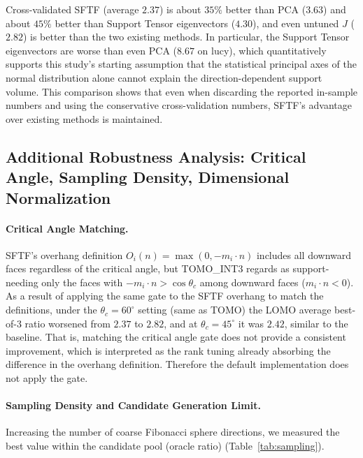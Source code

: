 \documentclass[11pt,a4paper]{article}
\begin{document}
Cross-validated SFTF (average $2.37$) is about $35\%$ better than PCA ($3.63$) and about $45\%$ better than Support Tensor eigenvectors ($4.30$),
and even untuned $J$ ($2.82$) is better than the two existing methods.
In particular, the Support Tensor eigenvectors are worse than even PCA ($8.67$ on lucy),
which quantitatively supports this study's starting assumption that the statistical principal axes of the normal distribution alone
cannot explain the direction-dependent support volume.
This comparison shows that even when discarding the reported in-sample numbers and using the conservative cross-validation numbers,
SFTF's advantage over existing methods is maintained.

\subsection{Additional Robustness Analysis: Critical Angle, Sampling Density, Dimensional Normalization}
\label{sec:robustness}

\paragraph{Critical Angle Matching.}
SFTF's overhang definition $O_i(n)=\max(0,-m_i\cdot n)$ includes all downward faces regardless of the critical angle, but
TOMO\_INT3 regards as support-needing only the faces with $-m_i\cdot n>\cos\theta_c$ among downward faces ($m_i\cdot n<0$).
As a result of applying the same gate to the SFTF overhang to match the definitions,
under the $\theta_c=60^\circ$ setting (same as TOMO) the LOMO average best-of-3 ratio
worsened from $2.37$ to $2.82$, and at $\theta_c=45^\circ$ it was $2.42$, similar to the baseline.
That is, matching the critical angle gate does not provide a consistent improvement,
which is interpreted as the rank tuning already absorbing the difference in the overhang definition.
Therefore the default implementation does not apply the gate.

\paragraph{Sampling Density and Candidate Generation Limit.}
Increasing the number of coarse Fibonacci sphere directions, we measured the best value within the candidate pool (oracle ratio) (Table~\ref{tab:sampling}).
\end{document}
